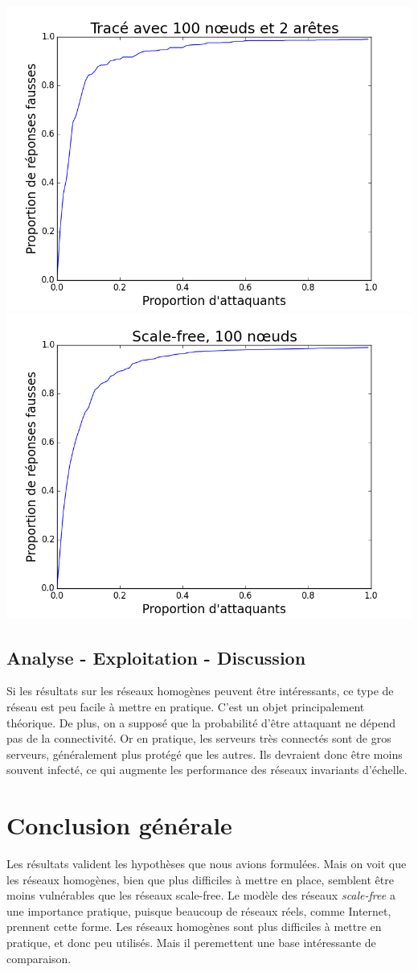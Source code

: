 \documentclass[12pt,a4paper]{article}
\begin{document}
\begin{center}
\includegraphics[width=0.49\linewidth]{../resultats/atkaleat/atkaleat-100-2-1.png}
\includegraphics[width=0.49\linewidth]{../resultats/scale-free/sf-t1-n100-1-it100.png}
 \label{comp}
\end{center}
	



\subsection{Analyse - Exploitation - Discussion} %

Si les résultats sur les réseaux homogènes peuvent être intéressants, ce type de réseau est peu facile à mettre en pratique.
C'est un objet principalement théorique.
De plus, on a supposé que la probabilité d'être attaquant ne dépend pas de la connectivité.
Or en pratique, les serveurs très connectés sont de gros serveurs, généralement plus protégé que les autres.
Ils devraient donc être moins souvent infecté, ce qui augmente les performance des réseaux invariants d'échelle.


\section{Conclusion générale} %

	Les résultats valident les hypothèses que nous avions formulées. Mais on voit que les réseaux homogènes, bien que plus difficiles à mettre en place, semblent être moins vulnérables que les réseaux scale-free. 
Le modèle des réseaux \emph{scale-free} a une importance pratique, puisque beaucoup de réseaux réels, comme Internet, prennent cette forme. Les réseaux homogènes sont plus difficiles à mettre en pratique, et donc peu utilisés. Mais il peremettent une base intéressante de comparaison.
\end{document}

